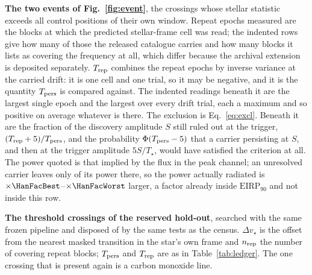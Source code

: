 \begin{table}
\centering
\caption{\textbf{The two events of Fig.~\ref{fig:event}}, the crossings whose
stellar statistic exceeds all \NCtrl{} control positions of their own window.
Repeat epochs measured are the blocks at which the predicted stellar-frame
cell was read; the indented rows give how many of those the released catalogue
carries and how many blocks it lists as covering the frequency at all, which
differ because the archival extension is deposited separately. $T_{\rm rep}$
combines the repeat epochs by inverse variance at the carried drift: it is one
cell and one trial, so it may be negative, and it is the quantity $T_{\rm
pers}$ is compared against. The indented readings beneath it are the largest
single epoch and the largest over every drift trial, each a maximum and so
positive on average whatever is there. The exclusion is Eq.~\ref{eq:excl}.
Beneath it are the fraction of the discovery amplitude $S$ still ruled out at
the trigger, $(T_{\rm rep}+5)/T_{\rm pers}$, and the probability
$\Phi(T_{\rm pers}-5)$ that a carrier persisting at $S$, and then at the
trigger amplitude $5S/T_\star$, would have satisfied the criterion at all.
The power quoted is that implied by the flux in the peak channel; an
unresolved carrier leaves only \HanMed{} of its power there, so the power
actually radiated is $\times\HanFacBest$--$\times\HanFacWorst$ larger, a
factor already inside $\mathrm{EIRP}_{90}$ and not inside this row.}
\label{tab:cand}
\footnotesize

\end{table}

\begin{table}
\centering
\caption{\textbf{The threshold crossings of the reserved hold-out}, searched
with the same frozen pipeline and disposed of by the same tests as the
census. $\Delta v_\star$ is the offset from the nearest masked transition in
the star's own frame and $n_{\rm rep}$ the number of covering repeat blocks;
$T_{\rm pers}$ and $T_{\rm rep}$ are as in Table~\ref{tab:ledger}. The one
crossing that is present again is a carbon monoxide line.}
\label{tab:holdout}
\scriptsize

\end{table}




